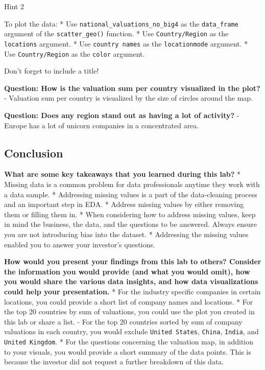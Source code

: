 \documentclass[11pt]{article}
\begin{document}
    Hint 2

To plot the data: * Use \texttt{national\_valuations\_no\_big4} as the
\texttt{data\_frame} argument of the \texttt{scatter\_geo()} function. *
Use \texttt{\textquotesingle{}Country/Region\textquotesingle{}} as the
\texttt{locations} argument. * Use
\texttt{\textquotesingle{}country\ names\textquotesingle{}} as the
\texttt{locationmode} argument. * Use
\texttt{\textquotesingle{}Country/Region\textquotesingle{}} as the
\texttt{color} argument.

Don't forget to include a title!

    \textbf{Question: How is the valuation sum per country visualized in the
plot?} - Valuation sum per country is visualized by the size of circles
around the map.

    \textbf{Question: Does any region stand out as having a lot of
activity?} - Europe has a lot of unicorn companies in a concentrated
area.

    \hypertarget{conclusion}{%
\subsection{Conclusion}\label{conclusion}}

\textbf{What are some key takeaways that you learned during this lab?} *
Missing data is a common problem for data professionals anytime they
work with a data sample. * Addressing missing values is a part of the
data-cleaning process and an important step in EDA. * Address missing
values by either removing them or filling them in. * When considering
how to address missing values, keep in mind the business, the data, and
the questions to be answered. Always ensure you are not introducing bias
into the dataset. * Addressing the missing values enabled you to answer
your investor's questions.

\textbf{How would you present your findings from this lab to others?
Consider the information you would provide (and what you would omit),
how you would share the various data insights, and how data
visualizations could help your presentation.} * For the industry
specific companies in certain locations, you could provide a short list
of company names and locations. * For the top 20 countries by sum of
valuations, you could use the plot you created in this lab or share a
list. - For the top 20 countries sorted by sum of company valuations in
each country, you would exclude \texttt{United\ States}, \texttt{China},
\texttt{India}, and \texttt{United\ Kingdom}. * For the questions
concerning the valuation map, in addition to your visuals, you would
provide a short summary of the data points. This is because the investor
did not request a further breakdown of this data.
\end{document}

